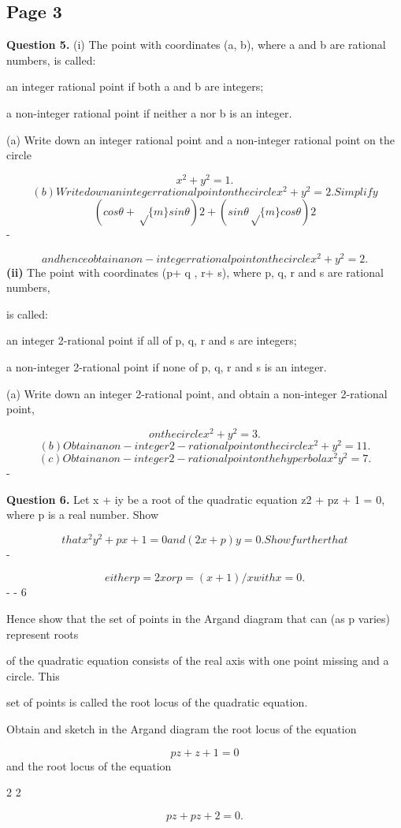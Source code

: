 \documentclass[12pt]{article}
\begin{document}
\subsection*{Page 3}
\begin{flushleft}
\bigskip\textbf{Question 5.} (i) The point with coordinates (a, b), where a and b are rational numbers, is called:\par
an integer rational point if both a and b are integers;\par
a non-integer rational point if neither a nor b is an integer.\par
(a) Write down an integer rational point and a non-integer rational point on the circle\par
\[x^2 + y^2 = 1.\]
\[(b) Write down an integer rational point on the circle x^2 + y^2 = 2. Simplify\]
\[(cos θ + \sqrt\{m\} sin θ) 2 + (sin θ \sqrt\{m\} cos θ) 2\]
-\par
\[and hence obtain a non-integer rational point on the circle x^2 + y^2 = 2 .\]
\textbf{(ii)} The point with coordinates (p+ q , r+ s), where p, q, r and s are rational numbers,\par
is called:\par
an integer 2-rational point if all of p, q, r and s are integers;\par
a non-integer 2-rational point if none of p, q, r and s is an integer.\par
(a) Write down an integer 2-rational point, and obtain a non-integer 2-rational point,\par
\[on the circle x^2 + y^2 = 3 .\]
\[(b) Obtain a non-integer 2-rational point on the circle x^2 + y^2 = 11 .\]
\[(c) Obtain a non-integer 2-rational point on the hyperbola x^2 y^2 = 7.\]
-\par
\bigskip\textbf{Question 6.} Let x + iy be a root of the quadratic equation z2 + pz + 1 = 0, where p is a real number. Show\par
\[that x^2 y^2 + px + 1 = 0 and (2x + p)y = 0. Show further that\]
-\par
\[either p = 2x or p = (x + 1)/x with x = 0 .\]
- - 6\par
Hence show that the set of points in the Argand diagram that can (as p varies) represent roots\par
of the quadratic equation consists of the real axis with one point missing and a circle. This\par
set of points is called the root locus of the quadratic equation.\par
Obtain and sketch in the Argand diagram the root locus of the equation\par
\[pz + z + 1 = 0\]
and the root locus of the equation\par
2 2\par
\[pz + p z + 2 = 0 .\]
\end{flushleft}
\end{document}
